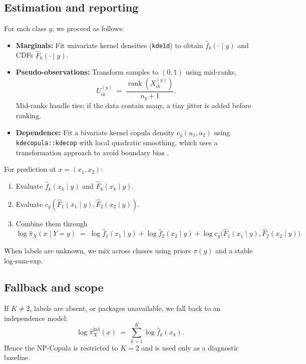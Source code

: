\documentclass[11pt,a4paper,twoside]{book}\usepackage[]{graphicx}\usepackage[]{xcolor}
\begin{document}
\subsection{Estimation and reporting}

For each class $y$, we proceed as follows:

\begin{itemize}
  \item \textbf{Marginals:} Fit univariate kernel densities (\texttt{kde1d}) to obtain $\widehat f_k(\cdot \mid y)$ and CDFs $\widehat F_k(\cdot \mid y)$.
  \item \textbf{Pseudo-observations:} Transform samples to $(0,1)$ using mid-ranks,
  \begin{equation}
    U_{ik}^{(y)} \;=\; \frac{\operatorname{rank}(X_{ik}^{(y)})}{n_y + 1}.
    \label{eq:copula-midranks}
  \end{equation}
  Mid-ranks handle ties; if the data contain many, a tiny jitter is added before ranking.
  \item \textbf{Dependence:} Fit a bivariate kernel copula density $c_y(u_1,u_2)$ using \texttt{kdecopula::kdecop} with local quadratic smoothing, which uses a transformation approach to avoid boundary bias \citep{nagler2017kdecopula}.
\end{itemize}

For prediction at $x=(x_1,x_2)$:
\begin{enumerate}
  \item Evaluate $\widehat f_k(x_k \mid y)$ and $\widehat F_k(x_k \mid y)$.
  \item Evaluate $c_y(\widehat F_1(x_1\mid y), \widehat F_2(x_2\mid y))$.
  \item Combine them through
  \begin{equation}
    \log \widehat \pi_X(x \mid Y=y) 
      \;=\; \log \widehat f_1(x_1 \mid y) + \log \widehat f_2(x_2 \mid y)
      + \log c_y\!\Big(\widehat F_1(x_1 \mid y), \widehat F_2(x_2 \mid y)\Big).
    \label{eq:copula-logdensity}
  \end{equation}
\end{enumerate}
When labels are unknown, we mix across classes using priors $\pi(y)$ and a stable log-sum-exp.

\subsection{Fallback and scope}

If $K\neq 2$, labels are absent, or packages unavailable, we fall back to an independence model:
\begin{equation}
  \log \widehat \pi_X^{\mathrm{ind}}(x) \;=\; \sum_{k=1}^{K} \log \widehat f_k(x_k).
  \label{eq:copula-independence}
\end{equation}
Hence the NP-Copula is restricted to $K=2$ and is used only as a diagnostic baseline.
\end{document}
